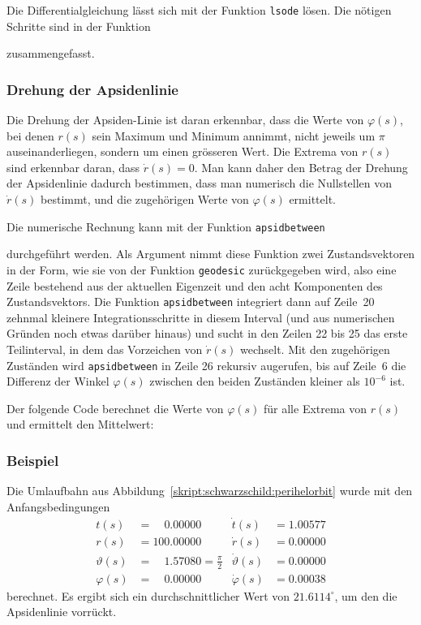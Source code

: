Die Differentialgleichung lässt sich mit der Funktion \texttt{lsode}
lösen.
Die nötigen Schritte sind in der Funktion

zusammengefasst.

\subsubsection{Drehung der Apsidenlinie}
Die Drehung der Apsiden-Linie ist daran erkennbar, dass die Werte von
$\varphi(s)$, bei denen $r(s)$ sein Maximum und Minimum annimmt,
nicht jeweils um $\pi$ auseinanderliegen, sondern um einen grösseren
Wert.
Die Extrema von $r(s)$ sind erkennbar daran, dass $\dot r(s)=0$.
Man kann daher den Betrag der Drehung der Apsidenlinie dadurch
bestimmen, dass man numerisch die Nullstellen von $\dot r(s)$
bestimmt, und die zugehörigen Werte von $\varphi(s)$ ermittelt.

Die numerische Rechnung kann mit der Funktion \texttt{apsidbetween}

durchgeführt werden.
Als Argument nimmt diese Funktion zwei Zustandsvektoren in der Form,
wie sie von der Funktion \texttt{geodesic}
zurückgegeben wird, also eine Zeile bestehend aus der aktuellen
Eigenzeit und den acht Komponenten des Zustandsvektors.
Die Funktion \texttt{apsidbetween} integriert dann auf Zeile~20
zehnmal kleinere Integrationsschritte in diesem Interval (und aus numerischen
Gründen noch etwas darüber hinaus) und sucht in den Zeilen 22 bis 25
das
erste Teilinterval, in dem das Vorzeichen von $\dot r(s)$ wechselt.
Mit den zugehörigen Zuständen wird \texttt{apsidbetween}
in Zeile 26
rekursiv augerufen, bis auf Zeile~6 die Differenz der Winkel $\varphi(s)$
zwischen den beiden Zuständen kleiner als $10^{-6}$ ist.

Der folgende Code berechnet die Werte von $\varphi(s)$ für alle
Extrema von $r(s)$ und ermittelt den Mittelwert:


\subsubsection{Beispiel}
Die Umlaufbahn aus Abbildung~\ref{skript:schwarzschild:perihelorbit}
wurde mit den Anfangsbedingungen
\begin{equation}
\begin{aligned}
t(s)        &=\phantom{00}0.00000                    &\dot t(s)         &= 1.00577\\
r(s)        &=          100.00000                    &\dot r(s)         &= 0.00000\\
\vartheta(s)&=\phantom{00}1.57080=\textstyle\frac\pi2&\dot \vartheta(s) &= 0.00000\\
\varphi(s)  &=\phantom{00}0.00000                    &\dot \varphi(s)   &= 0.00038
\end{aligned}
\label{skript:schwarzschild:anfangsbedingung:normal}
\end{equation}
berechnet.
Es ergibt sich ein durchschnittlicher Wert von $21.6114^\circ$, um den die
Apsidenlinie vorrückt.

